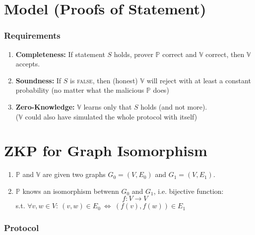 \documentclass{report}
\begin{document}
\section{Model (Proofs of Statement)}
\begin{adjustwidth}{2em}{2em}
	\begin{tikzpicture}
	\end{tikzpicture}
	\subsubsection{Requirements}
	\begin{adjustwidth}{2em}{}
		\begin{enumerate}
			\item \textbf{Completeness:} If statement $S$ holds, prover $\mathbb{P}$ correct and $\mathbb{V}$ correct, then $\mathbb{V}$ accepts.
			\item \textbf{Soundness:} If $S$ is \textsc{false}, then (honest) $\mathbb{V}$ will reject with at least a constant probability (no matter what the malicious $\mathbb{P}$ does)
			\item \textbf{Zero-Knowledge:} $\mathbb{V}$ learns only that $S$ holds (and not more). \\
			\indent ($\mathbb{V}$ could also have simulated the whole protocol with itself)
		\end{enumerate}
	\end{adjustwidth}
\end{adjustwidth}

\section{ZKP for Graph Isomorphism}
\begin{adjustwidth}{2em}{2em}
	\begin{enumerate}[\small\textbullet]
		\item $\mathbb{P}$ and $\mathbb{V}$ are given two graphs $G_0 = (V, E_0)$ and $G_1 = (V, E_1)$.
		\item $\mathbb{P}$ knows an isomorphism betwenn $G_0$ and $G_1$, i.e. bijective function:
		\[
			f: V \rightarrow V
		\]
		s.t. $\forall v,w \in V: \ (v,w) \in E_0 \ \Leftrightarrow \ (f(v), f(w)) \in E_1$
	\end{enumerate}
	\subsubsection{Protocol}
	\begin{tikzpicture}
	\end{tikzpicture}
	\begin{adjustwidth}{2em}{}
	\end{adjustwidth}
\end{adjustwidth}
\end{document}
